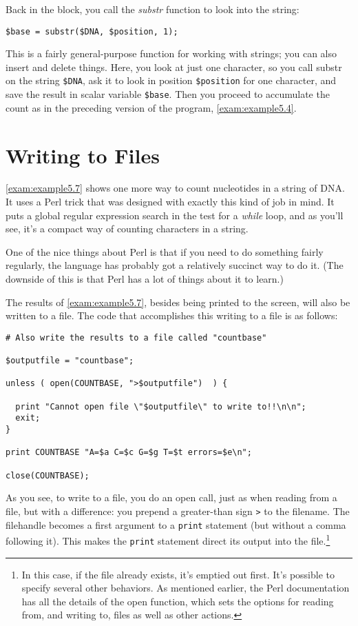 Back in the block, you call the \textit{substr} function to look into the string: 

\begin{lstlisting}
$base = substr($DNA, $position, 1);
\end{lstlisting}

This is a fairly general-purpose function for working with strings; you can also insert and delete things. Here, you look at just one character, so you call substr on the string \verb|$DNA|, ask it to look in position \verb|$position| for one character, and save the result in scalar variable \verb|$base|. Then you proceed to accumulate the count as in the preceding version of the program, \autoref{exam:example5.4}. 

\section{Writing to Files}
\autoref{exam:example5.7} shows one more way to count nucleotides in a string of DNA.  It uses a Perl trick that was designed with exactly this kind of job in mind. It puts a global regular expression search in the test for a \textit{while} loop, and as you'll see, it's a compact way of counting characters in a string.

One of the nice things about Perl is that if you need to do something fairly regularly, the language has probably got a relatively succinct way to do it. (The downside of this is that Perl has a lot of things about it to learn.)

The results of \autoref{exam:example5.7}, besides being printed to the screen, will also be written to a file. The code that accomplishes this writing to a file is as follows: 

\begin{lstlisting}
# Also write the results to a file called "countbase"

$outputfile = "countbase";

unless ( open(COUNTBASE, ">$outputfile")  ) {

  print "Cannot open file \"$outputfile\" to write to!!\n\n";
  exit;
}

print COUNTBASE "A=$a C=$c G=$g T=$t errors=$e\n";

close(COUNTBASE);
\end{lstlisting}

As you see, to write to a file, you do an open call, just as when reading from a file, but with a difference: you prepend a greater-than sign \verb|>| to the filename. The filehandle becomes a first argument to a \verb|print| statement (but without a comma following it). This makes the \verb|print| statement direct its output into the file.\footnote{In this case, if the file already exists, it's emptied out first. It's possible to specify several other behaviors. As mentioned earlier, the Perl documentation has all the details of the open function, which sets the options for reading from, and writing to, files as well as other actions.}


